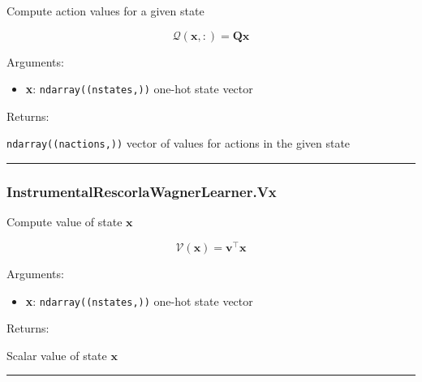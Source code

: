 \begin{Shaded}
\begin{Highlighting}[]
\end{Highlighting}
\end{Shaded}

Compute action values for a given state

\[
\mathcal Q(\mathbf x, :) = \mathbf Q \mathbf x
\]

Arguments:

\begin{itemize}
\tightlist
\item
  \textbf{x}: \texttt{ndarray((nstates,))} one-hot state vector
\end{itemize}

Returns:

\texttt{ndarray((nactions,))} vector of values for actions in the given
state

\begin{center}\rule{0.5\linewidth}{\linethickness}\end{center}

\subsubsection{InstrumentalRescorlaWagnerLearner.Vx}\label{instrumentalrescorlawagnerlearner.vx}

\begin{Shaded}
\begin{Highlighting}[]
\end{Highlighting}
\end{Shaded}

Compute value of state \(\mathbf x\)

\[
\mathcal V(\mathbf x) = \mathbf v^\top \mathbf x
\]

Arguments:

\begin{itemize}
\tightlist
\item
  \textbf{x}: \texttt{ndarray((nstates,))} one-hot state vector
\end{itemize}

Returns:

Scalar value of state \(\mathbf x\)

\begin{center}\rule{0.5\linewidth}{\linethickness}\end{center}

